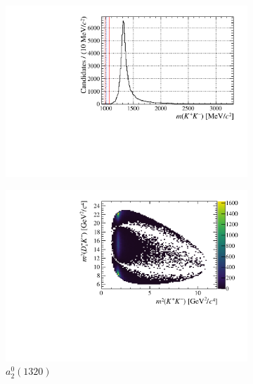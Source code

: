 \begin{figure}[!ht]
    \begin{subfigure}[t]{0.32\textwidth}    
        \centering 
        \includegraphics[width=1.0\textwidth]{figs/B2DsPhi/a2_1320_phi_mass.pdf}
    \end{subfigure}
    \begin{subfigure}[t]{0.32\textwidth}    
        \centering 
        \includegraphics[width=1.0\textwidth]{figs/B2DsPhi/a2_1320_Dalitz_plot.pdf}
        \caption{$a_{2}^{0}(1320)$}
    \end{subfigure}
    \begin{subfigure}[t]{0.32\textwidth}    
        \centering 

\end{subfigure}
\end{figure}
